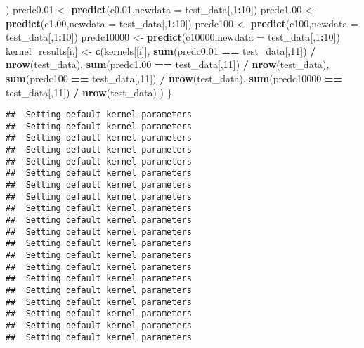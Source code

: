 \documentclass[
]{article}
\newenvironment{Shaded}{\begin{snugshade}}{\end{snugshade}}
\newcommand{\DataTypeTok}[1]{\textcolor[rgb]{0.13,0.29,0.53}{#1}}
\newcommand{\DecValTok}[1]{\textcolor[rgb]{0.00,0.00,0.81}{#1}}
\newcommand{\FloatTok}[1]{\textcolor[rgb]{0.00,0.00,0.81}{#1}}
\newcommand{\KeywordTok}[1]{\textcolor[rgb]{0.13,0.29,0.53}{\textbf{#1}}}
\newcommand{\NormalTok}[1]{#1}
\newcommand{\OperatorTok}[1]{\textcolor[rgb]{0.81,0.36,0.00}{\textbf{#1}}}
\newcommand{\StringTok}[1]{\textcolor[rgb]{0.31,0.60,0.02}{#1}}
\begin{document}
\begin{Shaded}
\begin{Highlighting}[]
\NormalTok{                    )}
\NormalTok{    predc0}\FloatTok{.01}\NormalTok{ <-}\StringTok{ }\KeywordTok{predict}\NormalTok{(c0}\FloatTok{.01}\NormalTok{,}\DataTypeTok{newdata =}\NormalTok{ test_data[,}\DecValTok{1}\OperatorTok{:}\DecValTok{10}\NormalTok{])}
\NormalTok{    predc1}\FloatTok{.00}\NormalTok{ <-}\StringTok{ }\KeywordTok{predict}\NormalTok{(c1}\FloatTok{.00}\NormalTok{,}\DataTypeTok{newdata =}\NormalTok{ test_data[,}\DecValTok{1}\OperatorTok{:}\DecValTok{10}\NormalTok{])}
\NormalTok{    predc100 <-}\StringTok{ }\KeywordTok{predict}\NormalTok{(c100,}\DataTypeTok{newdata =}\NormalTok{ test_data[,}\DecValTok{1}\OperatorTok{:}\DecValTok{10}\NormalTok{])}
\NormalTok{    predc10000 <-}\StringTok{ }\KeywordTok{predict}\NormalTok{(c10000,}\DataTypeTok{newdata =}\NormalTok{ test_data[,}\DecValTok{1}\OperatorTok{:}\DecValTok{10}\NormalTok{])}
\NormalTok{    kernel_results[i,] <-}\StringTok{ }\KeywordTok{c}\NormalTok{(kernels[[i]], }
                            \KeywordTok{sum}\NormalTok{(predc0}\FloatTok{.01} \OperatorTok{==}\StringTok{ }\NormalTok{test_data[,}\DecValTok{11}\NormalTok{]) }\OperatorTok{/}\StringTok{ }\KeywordTok{nrow}\NormalTok{(test_data),}
                            \KeywordTok{sum}\NormalTok{(predc1}\FloatTok{.00} \OperatorTok{==}\StringTok{ }\NormalTok{test_data[,}\DecValTok{11}\NormalTok{]) }\OperatorTok{/}\StringTok{ }\KeywordTok{nrow}\NormalTok{(test_data),}
                            \KeywordTok{sum}\NormalTok{(predc100 }\OperatorTok{==}\StringTok{ }\NormalTok{test_data[,}\DecValTok{11}\NormalTok{]) }\OperatorTok{/}\StringTok{ }\KeywordTok{nrow}\NormalTok{(test_data),}
                            \KeywordTok{sum}\NormalTok{(predc10000 }\OperatorTok{==}\StringTok{ }\NormalTok{test_data[,}\DecValTok{11}\NormalTok{]) }\OperatorTok{/}\StringTok{ }\KeywordTok{nrow}\NormalTok{(test_data)}
\NormalTok{                            )}
\NormalTok{\}}
\end{Highlighting}
\end{Shaded}

\begin{verbatim}
##  Setting default kernel parameters  
##  Setting default kernel parameters  
##  Setting default kernel parameters  
##  Setting default kernel parameters  
##  Setting default kernel parameters  
##  Setting default kernel parameters  
##  Setting default kernel parameters  
##  Setting default kernel parameters  
##  Setting default kernel parameters  
##  Setting default kernel parameters  
##  Setting default kernel parameters  
##  Setting default kernel parameters  
##  Setting default kernel parameters  
##  Setting default kernel parameters  
##  Setting default kernel parameters  
##  Setting default kernel parameters  
##  Setting default kernel parameters  
##  Setting default kernel parameters  
##  Setting default kernel parameters  
##  Setting default kernel parameters
\end{verbatim}
\end{document}

